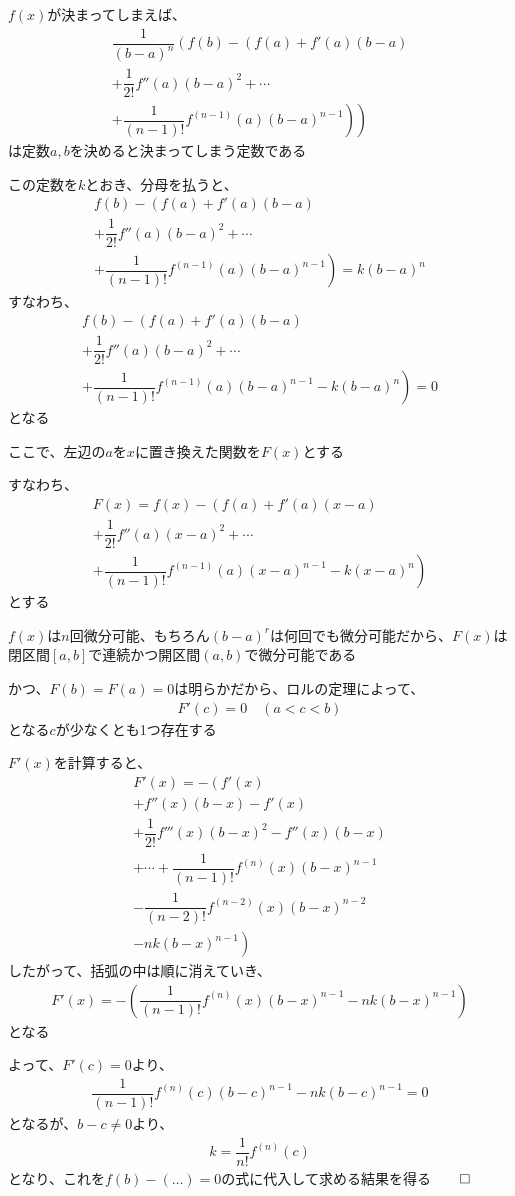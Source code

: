 \documentclass[../book_infinite_continuous_math]{subfiles}
\begin{document}
$f(x)$が決まってしまえば、
\begin{multline}
  \dfrac{1}{(b-a)^n} \left( f(b) - \left( f(a) + f'(a)(b-a) \right.\right. \\
  \left.\left. + \dfrac{1}{2!}f''(a)(b-a)^2 + \cdots \right.\right. \\
  \left.\left. + \dfrac{1}{(n-1)!}f^{(n-1)}(a)(b-a)^{n-1} \right) \right)
\end{multline}
は定数$a,b$を決めると決まってしまう定数である

この定数を$k$とおき、分母を払うと、
\begin{multline}
  f(b) - \left( f(a) + f'(a)(b-a) \right. \\
  \left. + \dfrac{1}{2!}f''(a)(b-a)^2 + \cdots \right. \\
  \left. + \dfrac{1}{(n-1)!}f^{(n-1)}(a)(b-a)^{n-1} \right) = k(b-a)^n
\end{multline}
すなわち、
\begin{multline}
  f(b) - \left( f(a) + f'(a)(b-a) \right. \\
  \left. + \dfrac{1}{2!}f''(a)(b-a)^2 + \cdots \right. \\
  \left. + \dfrac{1}{(n-1)!}f^{(n-1)}(a)(b-a)^{n-1} - k(b-a)^n \right) = 0
\end{multline}
となる

ここで、左辺の$a$を$x$に置き換えた関数を$F(x)$とする

すなわち、
\begin{multline}
  F(x) = f(x) - \left( f(a) + f'(a)(x-a) \right. \\
  \left. + \dfrac{1}{2!}f''(a)(x-a)^2 + \cdots \right. \\
  \left. + \dfrac{1}{(n-1)!}f^{(n-1)}(a)(x-a)^{n-1} - k(x-a)^n \right)
\end{multline}
とする

$f(x)$は$n$回微分可能、もちろん$(b-a)^r$は何回でも微分可能だから、$F(x)$は閉区間$[a, b]$で連続かつ開区間$(a, b)$で微分可能である

かつ、$F(b) = F(a) = 0$は明らかだから、ロルの定理によって、
\begin{gather}
  F'(c) = 0 \quad (a < c < b)
\end{gather}
となる$c$が少なくとも1つ存在する

$F'(x)$を計算すると、
\begin{multline}
  F'(x) = - \left( f'(x) \right. \\
  \left. + f''(x)(b-x) - f'(x) \right. \\
  \left. + \dfrac{1}{2!}f'''(x)(b-x)^2 - f''(x)(b-x) \right. \\
  \left. + \cdots + \dfrac{1}{(n-1)!}f^{(n)}(x)(b-x)^{n-1} \right. \\
  \left. - \dfrac{1}{(n-2)!}f^{(n-2)}(x)(b-x)^{n-2} \right. \\
  \left. - nk(b-x)^{n-1} \right)
\end{multline}
したがって、括弧の中は順に消えていき、
\begin{gather}
  F'(x)= - \left(\dfrac{1}{(n-1)!}f^{(n)}(x)(b-x)^{n-1} - nk(b-x)^{n-1} \right)
\end{gather}
となる

よって、$F'(c) = 0$より、
\begin{gather}
  \dfrac{1}{(n-1)!}f^{(n)}(c)(b-c)^{n-1} - nk(b-c)^{n-1} = 0
\end{gather}
となるが、$b-c \neq 0$より、
\begin{gather}
  k = \dfrac{1}{n!}f^{(n)}(c)
\end{gather}
となり、これを$f(b) - (\ldots) = 0$の式に代入して求める結果を得る$\qed$
\end{document}
